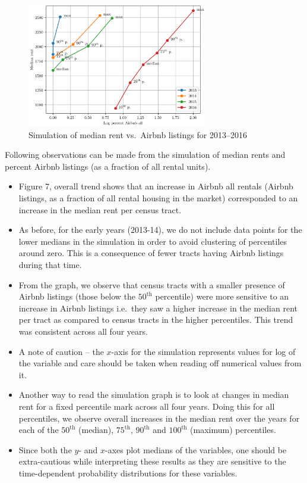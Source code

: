 \documentclass[10pt,letterpaper,onecolumn]{article}
\begin{document}
\begin{figure}[H]
  \centering
  \includegraphics[width=0.7\textwidth]{Median_rent_vs_Log_percent_Airbnb_all.png}
  \caption{Simulation of median rent vs.\ Airbnb listings for 2013--2016}
\end{figure}

Following observations can be made from the simulation of median rents
and percent Airbnb listings (as a fraction of all rental units).

\begin{itemize}
\item
Figure 7, overall trend shows that an increase in Airbnb all rentals
(Airbnb listings, as a fraction of all rental housing in the market)
corresponded to an increase in the median rent per census tract.
\item
As before, for the early years (2013-14), we do not include data
points for the lower medians in the simulation in order to avoid
clustering of percentiles around zero. This is a consequence of fewer
tracts having Airbnb listings during that time.
\item
From the graph, we observe that census tracts with a smaller presence
of Airbnb listings (those below the \(50^\text{th}\) percentile) were more
sensitive to an increase in Airbnb listings i.e.\ they saw a higher
increase in the median rent per tract as compared to census tracts in
the higher percentiles. This trend was consistent across all four
years.
\item
A note of caution -- the \(x\)-axis for the simulation represents values
for log of the variable and care should be taken when reading off
numerical values from it.
\item
Another way to read the simulation graph is to look at changes in
median rent for a fixed percentile mark across all four years. Doing
this for all percentiles, we observe overall increases in the median
rent over the years for each of the \(50^\text{th}\) (median), \(75^\text{th}\), \(90^\text{th}\) and
\(100^\text{th}\) (maximum) percentiles.

\item Since both the \(y\)- and \(x\)-axes plot medians of the variables, one
should be extra-cautious while interpreting these results as they are
sensitive to the time-dependent probability distributions for these
variables.
\end{itemize}
\end{document}
